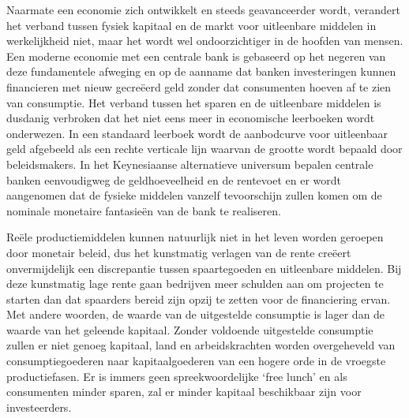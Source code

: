\documentclass[
  a5paper,
  smalldemyvopaper,11pt,twoside,onecolumn,openright,extrafontsizes,
hidelinks]{memoir}
\begin{document}
Naarmate een economie zich ontwikkelt en steeds geavanceerder wordt,
verandert het verband tussen fysiek kapitaal en de markt voor
uitleenbare middelen in werkelijkheid niet, maar het wordt wel
ondoorzichtiger in de hoofden van mensen. Een moderne economie met een
centrale bank is gebaseerd op het negeren van deze fundamentele afweging
en op de aanname dat banken investeringen kunnen financieren met nieuw
gecreëerd geld zonder dat consumenten hoeven af te zien van consumptie.
Het verband tussen het sparen en de uitleenbare middelen is dusdanig
verbroken dat het niet eens meer in economische leerboeken wordt
onderwezen. In een standaard leerboek wordt de aanbodcurve voor
uitleenbaar geld afgebeeld als een rechte verticale lijn waarvan de
grootte wordt bepaald door beleidsmakers. In het Keynesiaanse
alternatieve universum bepalen centrale banken eenvoudigweg de
geldhoeveelheid en de rentevoet en er wordt aangenomen dat de fysieke
middelen vanzelf tevoorschijn zullen komen om de nominale monetaire
fantasieën van de bank te realiseren.

Reële productiemiddelen kunnen natuurlijk niet in het leven worden
geroepen door monetair beleid, dus het kunstmatig verlagen van de rente
creëert onvermijdelijk een discrepantie tussen spaartegoeden en
uitleenbare middelen. Bij deze kunstmatig lage rente gaan bedrijven meer
schulden aan om projecten te starten dan dat spaarders bereid zijn opzij
te zetten voor de financiering ervan. Met andere woorden, de waarde van
de uitgestelde consumptie is lager dan de waarde van het geleende
kapitaal. Zonder voldoende uitgestelde consumptie zullen er niet genoeg
kapitaal, land en arbeidskrachten worden overgeheveld van
consumptiegoederen naar kapitaalgoederen van een hogere orde in de
vroegste productiefasen. Er is immers geen spreekwoordelijke `free
lunch' en als consumenten minder sparen, zal er minder kapitaal
beschikbaar zijn voor investeerders.
\end{document}
